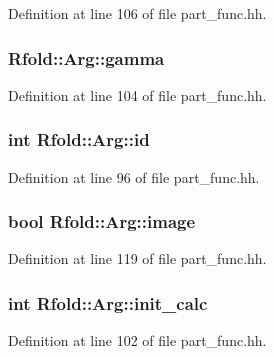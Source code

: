 Definition at line 106 of file part\+\_\+func.\+hh.

\hypertarget{class_rfold_1_1_arg_a54717ae319eecf4154dba39e42094b60}{
\subsubsection[{gamma}]{ Rfold\+::\+Arg\+::gamma}}\label{class_rfold_1_1_arg_a54717ae319eecf4154dba39e42094b60}


Definition at line 104 of file part\+\_\+func.\+hh.

\hypertarget{class_rfold_1_1_arg_a49ec979ca116afb70aa7a25bff04d3a8}{
\subsubsection[{id}]{\setlength{\rightskip}{0pt plus 5cm}int Rfold\+::\+Arg\+::id}}\label{class_rfold_1_1_arg_a49ec979ca116afb70aa7a25bff04d3a8}


Definition at line 96 of file part\+\_\+func.\+hh.

\hypertarget{class_rfold_1_1_arg_ab7df3ff6900da414d534707f37d87c2d}{
\subsubsection[{image}]{\setlength{\rightskip}{0pt plus 5cm}bool Rfold\+::\+Arg\+::image}}\label{class_rfold_1_1_arg_ab7df3ff6900da414d534707f37d87c2d}


Definition at line 119 of file part\+\_\+func.\+hh.

\hypertarget{class_rfold_1_1_arg_af97e7ba185a8a01a2d6baa5a1689f077}{
\subsubsection[{init\+\_\+calc}]{\setlength{\rightskip}{0pt plus 5cm}int Rfold\+::\+Arg\+::init\+\_\+calc}}\label{class_rfold_1_1_arg_af97e7ba185a8a01a2d6baa5a1689f077}


Definition at line 102 of file part\+\_\+func.\+hh.

